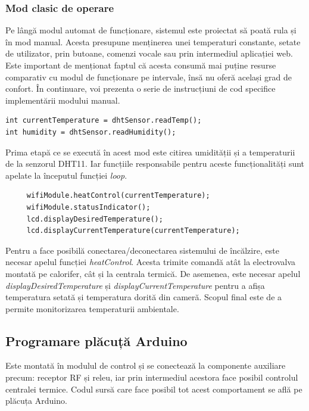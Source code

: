 \subsubsection{Mod clasic de operare}

	Pe lângă modul automat de funcționare, sistemul este proiectat să poată rula și în mod manual. Acesta presupune menținerea unei temperaturi constante, setate de utilizator, prin butoane, comenzi vocale sau prin intermediul aplicației web. Este important de menționat faptul că acesta consumă mai puține resurse comparativ cu modul de funcționare pe intervale, însă nu oferă același grad de confort. În continuare, voi prezenta o serie de instrucțiuni de cod specifice implementării modului manual.

\vspace{1em}
\begin{lstlisting}
int currentTemperature = dhtSensor.readTemp();
int humidity = dhtSensor.readHumidity();
\end{lstlisting}
\vspace{2em}	

	Prima etapă ce se execută în acest mod este citirea umidității și a temperaturii de la senzorul DHT11. Iar funcțiile responsabile pentru aceste funcționalități sunt apelate la începutul funcției \textit{loop}.

\vspace{1em}
\begin{lstlisting}
     wifiModule.heatControl(currentTemperature); 
     wifiModule.statusIndicator();
     lcd.displayDesiredTemperature();
     lcd.displayCurrentTemperature(currentTemperature);
\end{lstlisting}
\vspace{2em}	

	Pentru a face posibilă conectarea/deconectarea sistemului de încălzire, este necesar apelul funcției \textit{heatControl}. Acesta trimite comandă atât la electrovalva montată pe calorifer, cât și la centrala termică. De asemenea, este necesar apelul \textit{displayDesiredTemperature} și \textit{displayCurrentTemperature} pentru a afișa temperatura setată și temperatura dorită din cameră. Scopul final este de a permite monitorizarea temperaturii ambientale.

\subsection{Programare plăcuță Arduino}

	Este montată în modulul de control și se conectează la componente auxiliare precum: receptor RF și releu, iar prin intermediul acestora face posibil controlul centralei termice. Codul sursă care face posibil tot acest comportament se află pe plăcuța Arduino. 

